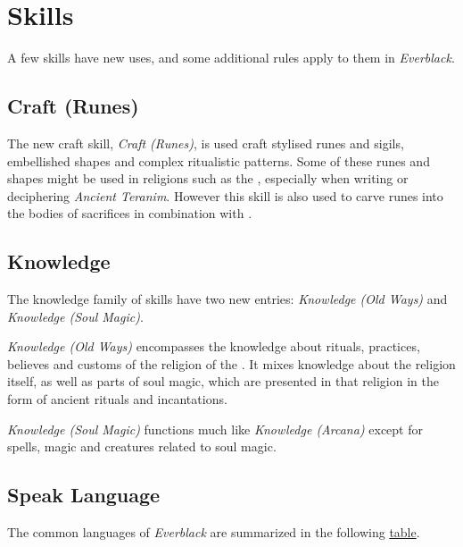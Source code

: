 \section{Skills}
\label{sec:Skills}

A few skills have new uses, and some additional rules apply to them in
\emph{Everblack}.

\subsection{Craft (Runes)}
\label{sec:Craft Runes}

The new craft skill, \emph{Craft (Runes)}, is used craft stylised runes and
sigils, embellished shapes and complex ritualistic patterns. Some of these
runes and shapes might be used in religions such as the , especially when writing or deciphering \emph{Ancient
  Teranim}. However this skill is also used to carve runes into the bodies of
sacrifices in combination with .

\subsection{Knowledge}
\label{sec:Knowledge}

The knowledge family of skills have two new entries: \emph{Knowledge (Old Ways)}
and \emph{Knowledge (Soul Magic)}.

\emph{Knowledge (Old Ways)} encompasses the knowledge about rituals, practices,
believes and customs of the religion of the . It mixes
knowledge about the religion itself, as well as parts of soul magic, which are
presented in that religion in the form of ancient rituals and incantations.

\emph{Knowledge (Soul Magic)} functions much like \emph{Knowledge (Arcana)}
except for spells, magic and creatures related to soul magic.

\subsection{Speak Language}
\label{sec:Speak Language}

The common languages of \emph{Everblack} are summarized in the following
\hyperref[tbl:Languages]{table}.

